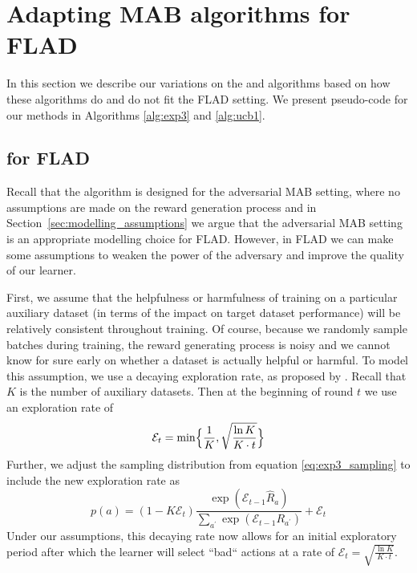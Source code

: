 \section{Adapting MAB algorithms for FLAD}
In this section we describe our variations on the \ex{} and \ucb{} algorithms based on how these algorithms do and do not fit the FLAD setting. We present pseudo-code for our methods in Algorithms \ref{alg:exp3} and \ref{alg:ucb1}.

\subsection{\ex{} for FLAD}

Recall that the \ex{} algorithm is designed for the adversarial MAB setting, where no assumptions are made on the reward generation process and in Section~\ref{sec:modelling_assumptions} we argue that the adversarial MAB setting is an appropriate modelling choice for FLAD.
However, in FLAD we can make some assumptions to weaken the power of the adversary and improve the quality of our learner.

First, we assume that the helpfulness or harmfulness of training on a particular auxiliary dataset (in terms of the impact on target dataset performance) will be relatively consistent throughout training.
Of course, because we randomly sample batches during training, the reward generating process is noisy and we cannot know for sure early on whether a dataset is actually helpful or harmful.
To model this assumption, we use a decaying exploration rate, as proposed by \citet{pmlr-v24-seldin12a}.
Recall that $K$ is the number of auxiliary datasets. Then at the beginning of round $t$ we use an exploration rate of
\begin{equation}
\label{eq:exploration_rate}
    \mathcal{E}_{t} = \min \Bigl\{\frac{1}{K}, \sqrt{\frac{\ln K}{K\cdot t}} \Bigr\}
\end{equation}
Further, we adjust the sampling distribution from equation \ref{eq:exp3_sampling} to include the new exploration rate as
\begin{equation}
\label{eq:our_exp3_sampling}
    p(a) = (1-K\mathcal{E}_{t})\frac{\exp(\mathcal{E}_{t-1}\hat{R}_{a})}{\sum_{a^{\prime}} \exp(\mathcal{E}_{t-1}R_{a^{\prime}})}+\mathcal{E}_{t}
\end{equation}
Under our assumptions, this decaying rate now allows for an initial exploratory period after which the learner will select ``bad`` actions at a rate of $\mathcal{E}_{t}=\sqrt{\frac{\ln K}{K\cdot t}}$.

